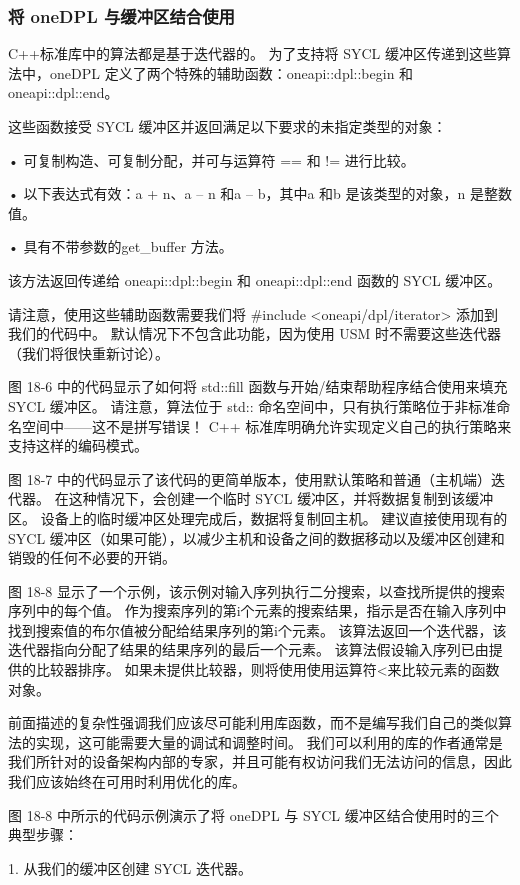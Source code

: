 \subsubsection{将 oneDPL 与缓冲区结合使用}
C++标准库中的算法都是基于迭代器的。 为了支持将 SYCL 缓冲区传递到这些算法中，oneDPL 定义了两个特殊的辅助函数：oneapi::dpl::begin 和 oneapi::dpl::end。

这些函数接受 SYCL 缓冲区并返回满足以下要求的未指定类型的对象：

• 可复制构造、可复制分配，并可与运算符 == 和 != 进行比较。

• 以下表达式有效：a + n、a – n 和a – b，其中a 和b 是该类型的对象，n 是整数值。

• 具有不带参数的get\_buffer 方法。

该方法返回传递给 oneapi::dpl::begin 和 oneapi::dpl::end 函数的 SYCL 缓冲区。

请注意，使用这些辅助函数需要我们将 \#include <oneapi/dpl/iterator> 添加到我们的代码中。 默认情况下不包含此功能，因为使用 USM 时不需要这些迭代器（我们将很快重新讨论）。

图 18-6 中的代码显示了如何将 std::fill 函数与开始/结束帮助程序结合使用来填充 SYCL 缓冲区。 请注意，算法位于 std:: 命名空间中，只有执行策略位于非标准命名空间中——这不是拼写错误！ C++ 标准库明确允许实现定义自己的执行策略来支持这样的编码模式。

图 18-7 中的代码显示了该代码的更简单版本，使用默认策略和普通（主机端）迭代器。 在这种情况下，会创建一个临时 SYCL 缓冲区，并将数据复制到该缓冲区。 设备上的临时缓冲区处理完成后，数据将复制回主机。 建议直接使用现有的 SYCL 缓冲区（如果可能），以减少主机和设备之间的数据移动以及缓冲区创建和销毁的任何不必要的开销。

图 18-8 显示了一个示例，该示例对输入序列执行二分搜索，以查找所提供的搜索序列中的每个值。 作为搜索序列的第i个元素的搜索结果，指示是否在输入序列中找到搜索值的布尔值被分配给结果序列的第i个元素。 该算法返回一个迭代器，该迭代器指向分配了结果的结果序列的最后一个元素。 该算法假设输入序列已由提供的比较器排序。 如果未提供比较器，则将使用使用运算符<来比较元素的函数对象。

前面描述的复杂性强调我们应该尽可能利用库函数，而不是编写我们自己的类似算法的实现，这可能需要大量的调试和调整时间。 我们可以利用的库的作者通常是我们所针对的设备架构内部的专家，并且可能有权访问我们无法访问的信息，因此我们应该始终在可用时利用优化的库。

图 18-8 中所示的代码示例演示了将 oneDPL 与 SYCL 缓冲区结合使用时的三个典型步骤：

1. 从我们的缓冲区创建 SYCL 迭代器。

